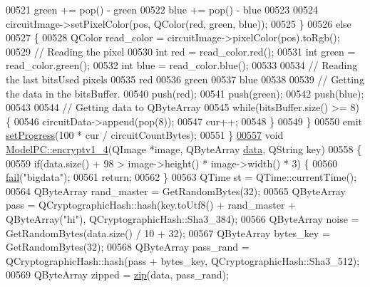 \begin{DoxyCode}
00521         green += pop() - green %
00522         blue += pop() - blue %
00523 
00524         circuitImage->setPixelColor(pos, QColor(red, green, blue));
00525     \}
00526     \textcolor{keywordflow}{else}
00527     \{
00528         QColor read\_color = circuitImage->pixelColor(pos).toRgb();
00529         \textcolor{comment}{// Reading the pixel}
00530         \textcolor{keywordtype}{int} red = read\_color.red();
00531         \textcolor{keywordtype}{int} green = read\_color.green();
00532         \textcolor{keywordtype}{int} blue = read\_color.blue();
00533 
00534         \textcolor{comment}{// Reading the last bitsUsed pixels}
00535         red %
00536         green %
00537         blue %
00538 
00539         \textcolor{comment}{// Getting the data in the bitsBuffer.}
00540         push(red);
00541         push(green);
00542         push(blue);
00543 
00544         \textcolor{comment}{// Getting data to QByteArray}
00545         \textcolor{keywordflow}{while}(bitsBuffer.size() >= 8) \{
00546             circuitData->append(pop(8));
00547             cur++;
00548         \}
00549     \}
00550     emit \hyperlink{class_model_p_c_afdcd80f0ed5062e145a71f09b0897547}{setProgress}(100 * cur / circuitCountBytes);
00551 \}
\hypertarget{modelpc_8cpp_source_l00557}{}\hyperlink{class_model_p_c_a4daefc3fb87a1f19172b9b20c987eb12}{00557} \textcolor{keywordtype}{void} \hyperlink{class_model_p_c_a4daefc3fb87a1f19172b9b20c987eb12}{ModelPC::encryptv1\_4}(QImage *image, QByteArray \hyperlink{namespace_errors_dict_setup_adf4c30d205d29df7343e26f7c62b0685}{data}, QString key)
00558 \{
00559     \textcolor{keywordflow}{if}(data.size() + 98 > image->height() * image->width() * 3) \{
00560         \hyperlink{class_model_p_c_a47464b59b7e37fcee25e55475708aabd}{fail}(\textcolor{stringliteral}{"bigdata"});
00561         \textcolor{keywordflow}{return};
00562     \}
00563     QTime st = QTime::currentTime();
00564     QByteArray rand\_master = GetRandomBytes(32);
00565     QByteArray pass = QCryptographicHash::hash(key.toUtf8() + rand\_master + QByteArray(\textcolor{stringliteral}{"hi"}), 
      QCryptographicHash::Sha3\_384);
00566     QByteArray noise = GetRandomBytes(data.size() / 10 + 32);
00567     QByteArray bytes\_key = GetRandomBytes(32);
00568     QByteArray pass\_rand = QCryptographicHash::hash(pass + bytes\_key, QCryptographicHash::Sha3\_512);
00569     QByteArray zipped = \hyperlink{class_model_p_c_afebbbfa4b07deba4f68fc6dfb50f353f}{zip}(data, pass\_rand);

\end{DoxyCode}
